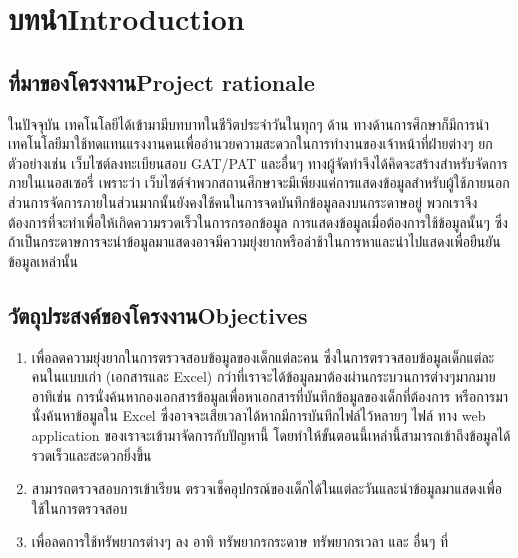 \chapter{\ifcpe บทนำ\else Introduction\fi}

\section{\ifcpe ที่มาของโครงงาน\else Project rationale\fi}

ในปัจจุบัน เทคโนโลยีได้เข้ามามีบทบาทในชีวิตประจำวันในทุกๆ ด้าน
ทางด้านการศึกษาก็มีการนำเทคโนโลยีมาใช้ทดแทนแรงงานคนเพื่ออำนวยความสะดวกในการทำงานของเจ้าหน้าที่ฝ่ายต่างๆ
ยกตัวอย่างเช่น เว็บไซต์ลงทะเบียนสอบ GAT/PAT และอื่นๆ
ทางผู้จัดทำจึงได้คิดจะสร้างสำหรับจัดการภายในเนอสเซอรี่
เพราะว่า เว็บไซต์จำพวกสถานศึกษาจะมีเพียงแค่การแสดงข้อมูลสำหรับผู้ใช้ภายนอก
ส่วนการจัดการภายในส่วนมากนั้นยังคงใช้คนในการจดบันทึกข้อมูลลงบนกระดาษอยู่
พวกเราจึงต้องการที่จะทำเพื่อให้เกิดความรวดเร็วในการกรอกข้อมูล การแสดงข้อมูลเมื่อต้องการใช้ข้อมูลนั้นๆ
ซึ่งถ้าเป็นกระดาษการจะนำข้อมูลมาแสดงอาจมีความยุ่งยากหรือล่าช้าในการหาและนำไปแสดงเพื่อยืนยันข้อมูลเหล่านั้น


\section{\ifcpe วัตถุประสงค์ของโครงงาน\else Objectives\fi}
\begin{enumerate}
    \item เพื่อลดความยุ่งยากในการตรวจสอบข้อมูลของเด็กแต่ละคน ซึ่งในการตรวจสอบข้อมูลเด็กแต่ละคนในแบบเก่า (เอกสารและ Excel) กว่าที่เราจะได้ข้อมูลมาต้องผ่านกระบวนการต่างๆมากมาย อาทิเช่น การนั่งค้นหากองเอกสารข้อมูลเพื่อหาเอกสารที่บันทึกข้อมูลของเด็กที่ต้องการ หรือการมานั่งค้นหาข้อมูลใน Excel 
    ซึ่งอาจจะเสียเวลาได้หากมีการบันทึกไฟล์ไว้หลายๆ ไฟล์
    ทาง web application ของเราจะเข้ามาจัดการกับปัญหานี้ โดยทำให้ขั้นตอนนี้เหล่านี้สามารถเข้าถึงข้อมูลได้รวดเร็วและสะดวกยิ่งขึ้น
    \item สามารถตรวจสอบการเข้าเรียน ตรวจเช็คอุปกรณ์ของเด็กได้ในแต่ละวันและนำข้อมูลมาแสดงเพื่อใช้ในการตรวจสอบ
    \item เพื่อลดการใช้ทรัพยากรต่างๆ ลง อาทิ ทรัพยากรกระดาษ ทรัพยากรเวลา และ อื่นๆ ที่
\end{enumerate}

